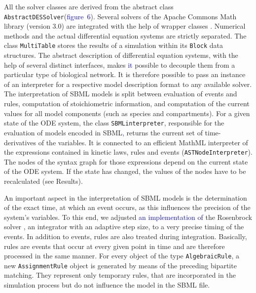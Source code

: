 \documentclass[10pt]{bmc_article}
\newenvironment{bmcformat}{\fussy\setboolean{publ}{true}}{\fussy}
\newcommand{\AbstractDESSolver}           {\texttt{Abstract\-DES\-Solver}\xspace}
\newcommand{\AlgebraicRule}               {\texttt{Algebraic\-Rule}\xspace}
\newcommand{\AssignmentRule}              {\texttt{Assignment\-Rule}\xspace}
\newcommand{\ASTNodeInterpreter}          {\texttt{ASTNode\-In\-terpreter}\xspace}
\newcommand{\Block}                       {\texttt{Block}\xspace}
\newcommand{\COR}[1]                      {\textcolor{blue}{#1}}
\newcommand{\MultiTable}                  {\texttt{Multi\-Table}\xspace}
\newcommand{\SBMLinterpreter}             {\texttt{SBML\-interpreter}\xspace}
\begin{document}
\begin{bmcformat}
All the solver classes are derived from the abstract class \AbstractDESSolver (\COR{figure~6}).
Several solvers of the Apache Commons Math library (version 3.0) are integrated with the help of wrapper classes \COR{\cite{ApacheCommonsMath2013}}.
Numerical methods and the actual differential equation systems are strictly separated.
The class \MultiTable stores the results of a simulation within its \Block data structures. 
%
The abstract description of differential equation systems, with the help of several distinct interfaces, makes \COR{it} possible to decouple them from a particular type of biological network. It is therefore possible to pass an instance of an interpreter for a respective model description format to any available solver.
%
The interpretation of \acs{SBML} models is split between evaluation of events and rules,
computation of stoichiometric information, and computation of the current values for all model components (such as species and compartments).
%
For a given state of the \acs{ODE} system, the class \SBMLinterpreter, responsible
for the evaluation of models encoded in \acs{SBML}\COR{,} returns the current set of
time-derivatives of the variables.
It is connected to an efficient MathML interpreter of the expressions contained
in kinetic laws, rules and events (\ASTNodeInterpreter).
The nodes of the syntax graph for those expressions depend on the current state of the \acs{ODE} system.
If the state has changed, the values of the nodes have to be recalculated (see Results).

%
An important aspect in the interpretation of \acs{SBML} models is the determination of the exact time\COR{,}
at which an event occurs, as this influences the precision of the system's variables.
To this end, we adjusted \COR{an implementation of} the Rosenbrock solver \cite{Kotcon2011},
an integrator with an adaptive step size, to a very precise timing of the events. %
% 
In addition to events, rules are also treated during integration.
Basically, rules are events that occur at every given point in time and are therefore processed in the same manner.
For every object of the type \AlgebraicRule, a new \AssignmentRule object is generated by means of the preceding bipartite matching.
They represent only temporary rules, that are incorporated in the simulation process but do not influence the model in the \acs{SBML} file.
%


\end{bmcformat}
\end{document}
